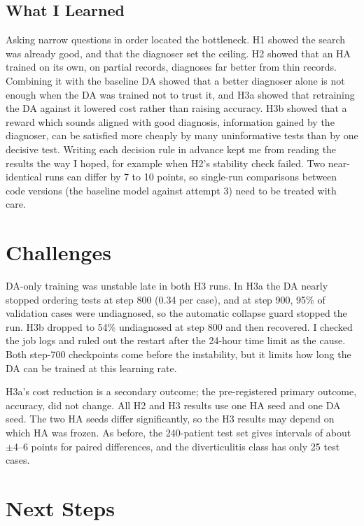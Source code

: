 \documentclass[11pt]{article}
\begin{document}
\subsection*{What I Learned}

Asking narrow questions in order located the bottleneck. H1 showed the search
was already good, and that the diagnoser set the ceiling. H2 showed that an HA
trained on its own, on partial records, diagnoses far better from thin records.
Combining it with the baseline DA showed that a better
diagnoser alone is not enough when the DA was trained not to trust it, and H3a
showed that retraining the DA against it lowered cost rather than raising
accuracy. H3b showed that a reward which sounds aligned with good diagnosis,
information gained by the diagnoser, can be satisfied more cheaply by many
uninformative tests than by one decisive test. Writing
each decision rule in advance kept me from reading the results the way I hoped,
for example when H2's stability check failed. Two near-identical runs can
differ by 7 to 10 points, so single-run comparisons between code versions
(the baseline model against attempt 3) need to be treated with care.

\section{Challenges}

DA-only training was unstable late in both H3 runs. In H3a the DA nearly
stopped ordering tests at step 800 (0.34 per case), and at step 900, 95\% of
validation cases were undiagnosed, so the automatic collapse guard stopped the
run. H3b dropped to 54\% undiagnosed at step 800 and then recovered. I checked
the job logs and ruled out the restart after the 24-hour time limit as the
cause. Both step-700 checkpoints come before the instability, but it limits how
long the DA can be trained at this learning rate.

H3a's cost reduction is a secondary outcome; the pre-registered primary outcome,
accuracy, did not change. All H2 and H3 results use one HA seed and one DA seed. The two HA seeds differ
significantly, so the H3 results may depend on which HA was frozen. As before,
the 240-patient test set gives intervals of about $\pm$4--6 points for paired
differences, and the diverticulitis class has only 25 test cases.

\section{Next Steps}
\end{document}
